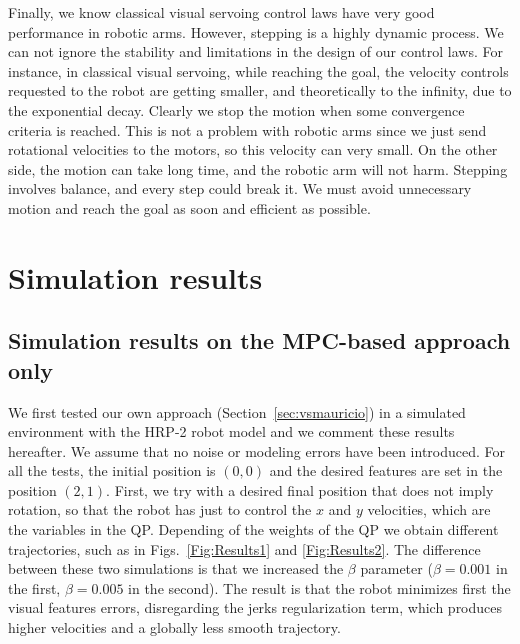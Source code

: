 Finally, we know classical visual servoing control laws have very good performance in robotic arms. However, stepping is a highly dynamic process. We can not ignore the stability and limitations in the design of our control laws. For instance, in classical visual servoing, while reaching the goal, the velocity controls requested to the robot are getting smaller, and theoretically to the infinity, due to the exponential decay. Clearly we stop the motion when some convergence criteria is reached. This is not a problem with robotic arms since we just send rotational velocities to the motors, so this velocity can very small. On the other side, the motion can take long time, and the robotic arm will not harm. Stepping involves balance, and every step could break it. We must avoid unnecessary motion and reach the goal as soon and efficient as possible.


\section{Simulation results}
\label{sec:results}

\subsection{Simulation results on the MPC-based approach only}

We first tested our own approach (Section~\ref{sec:vsmauricio}) in a simulated environment with the HRP-2 robot model and we comment these results hereafter. We assume that no noise or modeling errors have been introduced. For all the tests, the initial position is $(0,0)$ and the desired features are set in the position $(2,1)$. First, we try with a desired final position that does not imply rotation, so that the robot has just to control the $x$ and $y$ velocities, which are the variables in the QP. Depending of the weights of the QP we obtain different trajectories, such as in Figs.~\ref{Fig:Results1} and \ref{Fig:Results2}. The difference between these two simulations is that we increased the $\beta $ parameter ($\beta=0.001$ in the first, $\beta =0.005$ in the second). The result is that the robot minimizes first the visual features errors, disregarding the jerks regularization term, which produces higher velocities and a globally less smooth trajectory.


